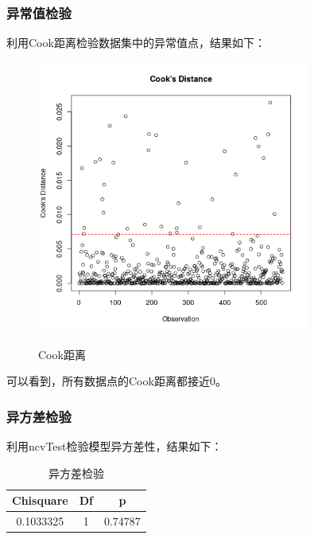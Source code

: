 \documentclass[fontset=ubuntu]{ctexart}
\begin{document}
            \subsubsection{异常值检验}
                利用Cook距离检验数据集中的异常值点，结果如下：
                \begin{figure}[htbp]
                    \centering
                    \includegraphics[width=0.8\textwidth]{../figures/cook.png}
                    \label{fig:cook}
                    \caption{Cook距离}
                \end{figure}
            
                可以看到，所有数据点的Cook距离都接近0。

            \subsubsection{异方差检验}
                利用ncvTest检验模型异方差性，结果如下：
                \begin{table}[htbp]
                    \centering
                    \caption{异方差检验}
                    \vspace{5pt}
                    \begin{tabular}{ccc}
                        \hline
                        Chisquare & Df & p \\
                        \hline
                        0.1033325 & 1 & 0.74787 \\
                        \hline
                    \end{tabular}
                \end{table}
                
\end{document}

